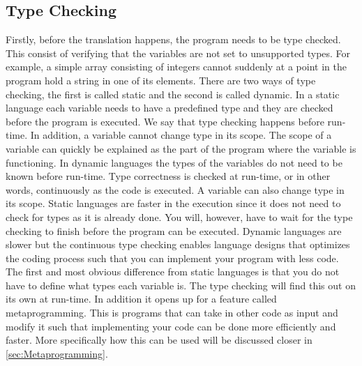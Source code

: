 \subsection{Type Checking}
Firstly, before the translation happens, the program needs to be type checked. This consist of verifying that the variables are not set to unsupported types. For example, a simple array consisting of integers cannot suddenly at a point in the program hold a string in one of its elements. There are two ways of type checking, the first is called static and the second is called dynamic. In a static language each variable needs to have a predefined type and they are checked before the program is executed. We say that type checking happens before run-time. In addition, a variable cannot change type in its scope. The scope of a variable can quickly be explained as the part of the program where the variable is functioning. In dynamic languages the types of the variables do not need to be known before run-time. Type correctness is checked at run-time, or in other words, continuously as the code is executed. A variable can also change type in its scope. Static languages are faster in the execution since it does not need to check for types as it is already done. You will, however, have to wait for the type checking to finish before the program can be executed. Dynamic languages are slower but the continuous type checking enables language designs that optimizes the coding process such that you can implement your program with less code. The first and most obvious difference from static languages is that you do not have to define what types each variable is. The type checking will find this out on its own at run-time. In addition it opens up for a feature called metaprogramming. This is programs that can take in other code as input and modify it such that implementing your code can be done more efficiently and faster. More specifically how this can be used will be discussed closer in \autoref{sec:Metaprogramming}.

